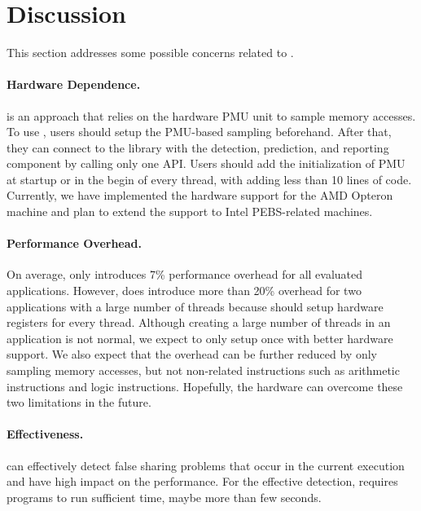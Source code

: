 \section{Discussion}

\label{sec:discuss}

This section addresses some possible concerns related to \Cheetah{}. 

\paragraph{Hardware Dependence.} \cheetah{} is an approach that relies on the hardware PMU unit to sample memory accesses. To use \cheetah{}, users should setup the PMU-based sampling beforehand. After that, they can connect to the library with the detection, prediction, and reporting component by calling only one API. Users should add the initialization of PMU at startup or in the begin of every thread, with adding less than 10 lines of code. Currently, we have implemented the hardware support for the AMD Opteron machine and plan to extend the support to Intel PEBS-related machines. 

\paragraph{Performance Overhead.} On average, \Cheetah{} only introduces 7\% performance overhead for all evaluated applications. However, \cheetah{} does introduce more than 20\% overhead for two applications with a large number of threads because \cheetah{} should setup hardware registers for every thread. Although creating a large number of threads in an application is not normal, we expect to only setup once with better hardware support. We also expect that the overhead can be further reduced by only sampling memory accesses, but not non-related instructions such as arithmetic instructions and logic instructions. Hopefully, the hardware can overcome these two limitations in the future.

\paragraph{Effectiveness.} \Cheetah{} can effectively detect false sharing problems that occur in the current execution and have high impact on the performance. For the effective detection, \Cheetah{} requires programs to run sufficient time, maybe more than few seconds. 
